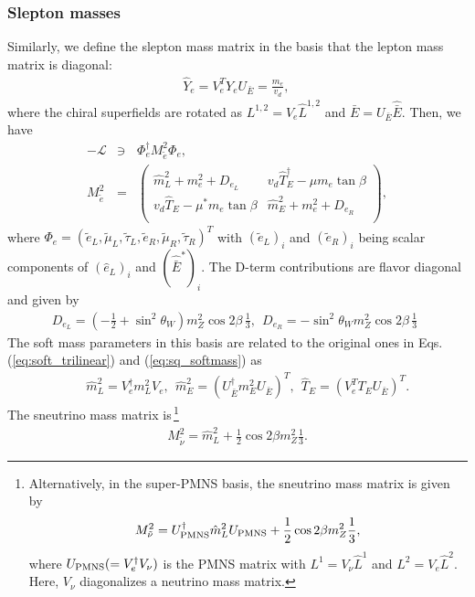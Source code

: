 \documentclass[preprint,3p,12pt]{elsarticle}
\begin{document}
\subsubsection{Slepton masses}
Similarly, we define the slepton mass matrix in the basis that the lepton mass matrix is diagonal:
\begin{eqnarray}
\hat Y_e = V_e^T Y_e U_{\bar E} = \frac{m_e}{v_d} , \, 
\end{eqnarray}
where the chiral superfields are rotated as $L^{1,2} = V_e \hat L^{1,2}$ and $\bar E = U_{\bar E} \hat{\bar E}$.
Then, we have
\begin{eqnarray}
-\mathcal{L} &\ni& \Phi_e^\dag  M_{\tilde e}^2 \Phi_e, \nonumber \\
M_{\tilde e}^2 &=& 
\left(
\begin{array}{cc}
\hat m_L^2  + m_e^2 + D_{e_L}&    v_d \hat T_E^\dag - \mu m_e \tan\beta  \\
v_d \hat T_E  - \mu^* m_e \tan\beta&    \hat m_{E}^2 + m_e^2 + D_{e_R}\\
\end{array}
\right),
\end{eqnarray}
where $\Phi_e = \left( \tilde e_L, \tilde \mu_L,  \tilde \tau_L,  \tilde e_R, \tilde \mu_R,  \tilde \tau_R
\right)^T$ with $(\tilde e_L)_i$ and $(\tilde e_R)_i$ being scalar components of $(\hat e_L)_i$ and $(\hat{\bar E}^*)_i$. The D-term contributions are flavor diagonal and given by
\begin{eqnarray}
D_{e_L} = (-\frac{1}{2}  + \sin^2\theta_W) m_Z^2 \cos2 \beta \, \frac{1}{3}, \ \
D_{e_R}= - \sin^2\theta_W m_Z^2 \cos2 \beta \, \frac{1}{3}\ \ 
\end{eqnarray}
The soft mass parameters in this basis are related to the original ones in Eqs. (\ref{eq:soft_trilinear}) and (\ref{eq:sq_softmass}) as
 \begin{eqnarray}
&& \hat m_{L}^2 = V_{e}^\dag m_{L}^2 V_e, \ \ \hat m_E^2  = (U_{\bar E}^\dag m_{E}^2 U_{\bar E})^T, \ \ 
 \hat T_E = (V_e^T T_E U_{\bar E})^T.
\end{eqnarray}
The sneutrino mass matrix is\,\footnote{
%
Alternatively, in the super-PMNS basis, the sneutrino mass matrix is given by
\begin{eqnarray}
M_{\tilde \nu}^2 = U_{\rm PMNS}^\dag \hat m_{L}^2 U_{\rm PMNS} +  \frac{1}{2}\cos2\beta m_Z^2 \frac{1}{3},
\end{eqnarray}
where $U_{\rm PMNS} ( = V_e^\dag V_{\nu} )$ is the PMNS matrix with $L^{1} = V_{\nu} \hat L^{1}$ and $L^{2} = V_{e} \hat L^{2}$.
Here, $V_{\nu}$ diagonalizes a neutrino mass matrix.
%
}
\begin{eqnarray}
M_{\tilde \nu}^2 = \hat m_{L}^2  +  \frac{1}{2}\cos2\beta m_Z^2 \frac{1}{3}.
\end{eqnarray}
\end{document}
